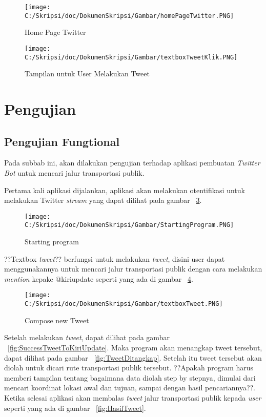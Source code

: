 \begin{figure}[htbp]
	\centering
		\texttt{[image: C:/Skripsi/doc/DokumenSkripsi/Gambar/homePageTwitter.PNG]}
	\caption{Home Page Twitter}
	\label{fig:homePageTwitter}
\end{figure}

\begin{figure}[htbp]
	\centering
		\texttt{[image: C:/Skripsi/doc/DokumenSkripsi/Gambar/textboxTweetKlik.PNG]}
	\caption{Tampilan untuk User Melakukan Tweet}
	\label{fig:textboxTweetKlik}
\end{figure}



\section{Pengujian}
\subsection{Pengujian Fungtional}
Pada subbab ini, akan dilakukan pengujian terhadap aplikasi pembuatan \textit{Twitter Bot} untuk mencari jalur transportasi publik.

Pertama kali aplikasi dijalankan, aplikasi akan melakukan otentifikasi untuk melakukan Twitter \textit{stream} yang dapat dilihat pada gambar ~\ref{fig:StartingProgram}.

\begin{figure}[htbp]
	\centering
		\texttt{[image: C:/Skripsi/doc/DokumenSkripsi/Gambar/StartingProgram.PNG]}
	\caption{Starting program}
	\label{fig:StartingProgram}
\end{figure}

??Textbox \textit{tweet}?? berfungsi untuk melakukan \textit{tweet}, disini user dapat menggunakannya untuk mencari jalur transportasi publik dengan cara melakukan \textit{mention} kepake @kiriupdate seperti yang ada di gambar ~\ref{fig:textboxTweet}.

\begin{figure}[htbp]
	\centering
		\texttt{[image: C:/Skripsi/doc/DokumenSkripsi/Gambar/textboxTweet.PNG]}
	\caption{Compose new Tweet}
	\label{fig:textboxTweet}
\end{figure}

Setelah melakukan \textit{tweet}, dapat dilihat pada gambar ~\ref{fig:SuccessTweetToKiriUpdate}. Maka program akan menangkap tweet tersebut, dapat dilihat pada gambar ~\ref{fig:TweetDitangkap}. Setelah itu tweet tersebut akan diolah untuk dicari rute transportasi publik tersebut. ??Apakah program harus memberi tampilan tentang bagaimana data diolah step by stepnya, dimulai dari mencari koordinat lokasi awal dan tujuan, sampai dengan hasil pencariannya??. Ketika selesai aplikasi akan membalas \textit{tweet} jalur transportasi publik kepada \textit{user} seperti yang ada di gambar ~\ref{fig:HasilTweet}.

